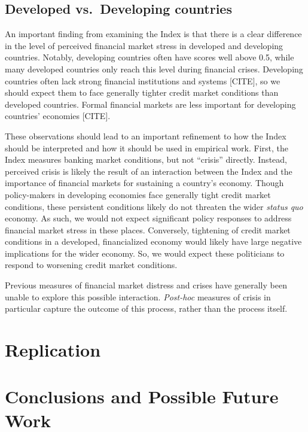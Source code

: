 \documentclass[]{article}
\begin{document}
\subsection{Developed vs.~Developing
countries}\label{developed-vs.developing-countries}

An important finding from examining the Index is that there is a clear
difference in the level of perceived financial market stress in
developed and developing countries. Notably, developing countries often
have scores well above 0.5, while many developed countries only reach
this level during financial crises. Developing countries often lack
strong financial institutions and systems {[}CITE{]}, so we should
expect them to face generally tighter credit market conditions than
developed countries. Formal financial markets are less important for
developing countries' economies {[}CITE{]}.

These observations should lead to an important refinement to how the
Index should be interpreted and how it should be used in empirical work.
First, the Index measures banking market conditions, but not ``crisis''
directly. Instead, perceived crisis is likely the result of an
interaction between the Index and the importance of financial markets
for sustaining a country's economy. Though policy-makers in developing
economies face generally tight credit market conditions, these
persistent conditions likely do not threaten the wider \emph{status quo}
economy. As such, we would not expect significant policy responses to
address financial market stress in these places. Conversely, tightening
of credit market conditions in a developed, financialized economy would
likely have large negative implications for the wider economy. So, we
would expect these politicians to respond to worsening credit market
conditions.

Previous measures of financial market distress and crises have generally
been unable to explore this possible interaction. \emph{Post-hoc}
measures of crisis in particular capture the outcome of this process,
rather than the process itself.

\section{Replication}\label{replication}

\section{Conclusions and Possible Future
Work}\label{conclusions-and-possible-future-work}
\end{document}
